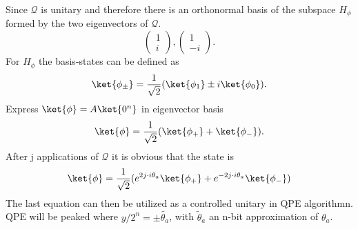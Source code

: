 \documentclass[../../main.tex]{subfiles}
\begin{document}
Since $\mathcal{Q}$ is unitary and therefore there is an orthonormal basis of the subspace $H_{\phi}$ formed
by the two eigenvectors of $\mathcal{Q}$.
\begin{equation}\label{eq:eigenvectors}
  \begin{pmatrix}
    1\\
    i
  \end{pmatrix}
  ,
  \begin{pmatrix}
    1\\
    -i
  \end{pmatrix}.
\end{equation}
For $H_{\phi}$ the basis-states can be defined as
\begin{equation}\label{eq:HBasisStates}
  \ket{\phi_{\pm}} = \frac{1}{\sqrt{2}} (\ket{\phi_1} \pm i \ket{\phi_0}).
\end{equation} 
Express $\ket{\phi} = A \ket{0^n}$ in eigenvector basis 
\begin{equation}
  \ket{\phi} = \frac{1}{\sqrt{2}} ( \ket{\phi_+} + \ket{\phi_-}).
\end{equation}
After j applications of $\mathcal{Q}$ it is obvious that the state is
\begin{equation}\label{eq:PhiAfterJQ}
  \ket{\phi} = \frac{1}{\sqrt{2}} ( e^{2j \cdot i \theta_a}\ket{\phi_+} + e^{-2j \cdot i \theta_a}\ket{\phi_-})
\end{equation}
The last equation can then be utilized as a controlled unitary in QPE algorithmn. QPE will be peaked where $y/2^n = \pm \tilde{\theta_a}$,
with $\tilde{\theta}_a$ an n-bit approximation of $\theta_a$.
\end{document}
